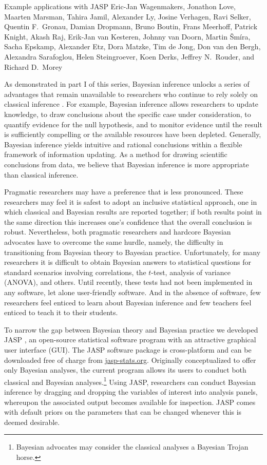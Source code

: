 {Example applications with JASP}
{Eric-Jan Wagenmakers, Jonathon Love, Maarten Marsman, Tahira Jamil, Alexander Ly, Josine Verhagen, Ravi Selker, Quentin F.\ Gronau, Damian Dropmann, Bruno Boutin, Frans Meerhoff, Patrick Knight, Akash Raj, Erik-Jan van Kesteren, Johnny van Doorn, Martin \v{S}m\'{i}ra, Sacha Epskamp, Alexander Etz, Dora Matzke, Tim de Jong, Don van den Bergh, Alexandra Sarafoglou, Helen Steingroever, Koen Derks, Jeffrey N.\ Rouder, and Richard D.\ Morey}

As demonstrated in part I of this series, Bayesian inference unlocks a series of advantages that remain unavailable to researchers who continue to rely solely on classical inference \cite{WagenmakersEtAlinpressPBRPartI}. For example, Bayesian inference allows researchers to update knowledge, to draw conclusions about the specific case under consideration, to quantify evidence for the null hypothesis, and to monitor evidence until the result is sufficiently compelling or the available resources have been depleted. Generally, Bayesian inference yields intuitive and rational conclusions within a flexible framework of information updating. As a method for drawing scientific conclusions from data, we believe that Bayesian inference is more appropriate than classical inference.

Pragmatic researchers may have a preference that is less pronounced. These researchers may feel it is safest to adopt an inclusive statistical approach, one in which classical and Bayesian results are reported together; if both results point in the same direction this increases one's confidence that the overall conclusion is robust. Nevertheless, both pragmatic researchers and hardcore Bayesian advocates have to overcome the same hurdle, namely, the difficulty in transitioning from Bayesian theory to Bayesian practice. Unfortunately, for many researchers it is difficult to obtain Bayesian answers to statistical questions for standard scenarios involving correlations, the $t$-test, analysis of variance (ANOVA), and others. Until recently, these tests had not been implemented in any software, let alone user-friendly software. And in the absence of software, few researchers feel enticed to learn about Bayesian inference and few teachers feel enticed to teach it to their students.

To narrow the gap between Bayesian theory and Bayesian practice we developed JASP \cite{JASP2017}, an open-source statistical software program with an attractive graphical user interface (GUI). The JASP software package is cross-platform and can be downloaded free of charge from \url{jasp-stats.org}. Originally conceptualized to offer only Bayesian analyses, the current program allows its users to conduct both classical and Bayesian analyses.\footnote{Bayesian advocates may consider the classical analyses a Bayesian Trojan horse.} Using JASP, researchers can conduct Bayesian inference by dragging and dropping the variables of interest into analysis panels, whereupon the associated output becomes available for inspection. JASP comes with default priors on the parameters that can be changed whenever this is deemed desirable.

